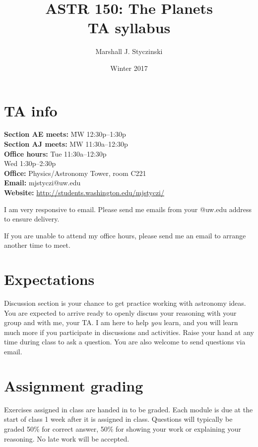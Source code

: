 \documentclass[12pt,letterpaper]{article}
\title{ASTR 150: The Planets\\ \vspace{0.25cm} \large{TA syllabus}}
\author{Marshall J. Styczinski}
\date{Winter 2017}
\begin{document}
\maketitle
\onehalfspacing
\thispagestyle{empty}

\section{TA info}
	\begin{tabbing}
		\textbf{Section AE meets:}		\= MW 12:30p--1:30p\\
		\textbf{Section AJ meets:}	\> MW 11:30a--12:30p\\[\baselineskip]
		\textbf{Office hours:}	\> Tue 11:30a--12:30p\\
			\> Wed 1:30p--2:30p\\
		\textbf{Office:}\> Physics/Astronomy Tower, room C221\\	
		\textbf{Email:}\> mjstyczi@uw.edu\\
		\textbf{Website:}\> \url{http://students.washington.edu/mjstyczi/}

	\end{tabbing}

	I am very responsive to email. Please send me emails from your @uw.edu address to ensure delivery.
	
	If you are unable to attend my office hours, please send me an email to arrange another time to meet.
	

\section{Expectations}
	Discussion section is your chance to get practice working with astronomy ideas. You are expected to arrive ready to openly discuss your reasoning with your group and with me, your TA. I am here to help \textit{you} learn, and you will learn much more if you participate in discussions and activities. Raise your hand at any time during class to ask a question. You are also welcome to send questions via email.
	
\section{Assignment grading}
	Exercises assigned in class are handed in to be graded. Each module is due at the start of class 1 week after it is assigned in class. Questions will typically be graded 50\% for correct answer, 50\% for showing your work or explaining your reasoning. No late work will be accepted.
\end{document}
